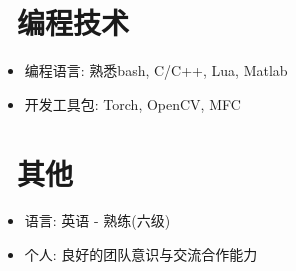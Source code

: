 \documentclass{resume}
\begin{document}

\begin{multicols}{2}
\section{\faTerminal\ 编程技术}
\begin{itemize}[parsep=0.5ex]
  \item 编程语言: 熟悉bash, C/C++, Lua, Matlab
  \item 开发工具包: Torch, OpenCV, MFC
\end{itemize}

\section{\faInfo\ 其他}
\begin{itemize}[parsep=0.5ex]
  \item 语言: 英语 - 熟练(六级)
  \item 个人: 良好的团队意识与交流合作能力
\end{itemize}

\end{multicols}
\end{document}
